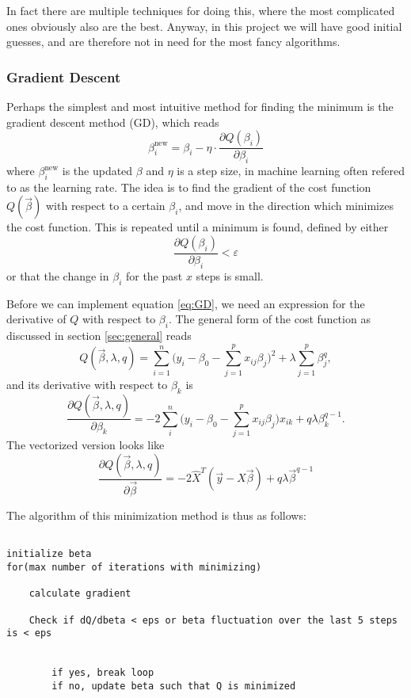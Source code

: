 In fact there are multiple techniques for doing this, where the most complicated ones obviously also are the best. Anyway, in this project we will have good initial guesses, and are therefore not in need for the most fancy algorithms. 

\subsubsection{Gradient Descent} \label{sec:gd}
Perhaps the simplest and most intuitive method for finding the minimum is the gradient descent method (GD), which reads
\begin{equation}
\label{eq:GD}
\beta_i^{\text{new}}=\beta_i - \eta\cdot\frac{\partial Q(\beta_i)}{\partial\beta_i}
\end{equation}
where $\beta_i^{\text{new}}$ is the updated $\beta$ and $\eta$ is a step size, in machine learning often refered to as the learning rate. The idea is to find the gradient of the cost function $Q(\vec{\beta})$ with respect to a certain $\beta_i$, and move in the direction which minimizes the cost function. This is repeated until a minimum is found, defined by either
\begin{equation}
\frac{\partial Q(\beta_i)}{\partial\beta_i}<\varepsilon
\end{equation}
or that the change in $\beta_i$ for the past $x$ steps is small. 
\par 
\vspace{3mm}

Before we can implement equation \eqref{eq:GD}, we need an expression for the derivative of $Q$ with respect to $\beta_i$. The general form of the cost function as discussed in section \ref{sec:general} reads
\begin{equation}
Q(\vec{\beta},\lambda,q)=\sum_{i=1}^{n}\Big(y_i-\beta_0-\sum_{j=1}^px_{ij}\beta_j\Big)^2+\lambda\sum_{j=1}^p\beta_j^q,
\label{eq:cost_gen}
\end{equation}
and its derivative with respect to $\beta_k$ is
\begin{equation}
\frac{\partial Q(\vec{\beta},\lambda,q)}{\partial\beta_k}=-2\sum_i^n\Big(y_i-\beta_0-\sum_{j=1}^px_{ij}\beta_j\Big)x_{ik}+q\lambda\beta_k^{q-1}.
\label{eq:der_cost_gen}
\end{equation}
The vectorized version looks like
\begin{equation}
\frac{\partial Q(\vec{\beta},\lambda,q)}{\partial\vec{\beta}}=-2\hat{X}^T(\vec{y}-\hat{X}\vec{\beta})+q\lambda\vec{\beta}^{q-1}
\label{eq:der_cost_gen_vec}
\end{equation}

The algorithm of this minimization method is thus as follows:

\lstset{basicstyle=\scriptsize}
\begin{lstlisting}

initialize beta
for(max number of iterations with minimizing)
	
	calculate gradient
	
	Check if dQ/dbeta < eps or beta fluctuation over the last 5 steps is < eps
	
	
		if yes, break loop
		if no, update beta such that Q is minimized


\end{lstlisting}